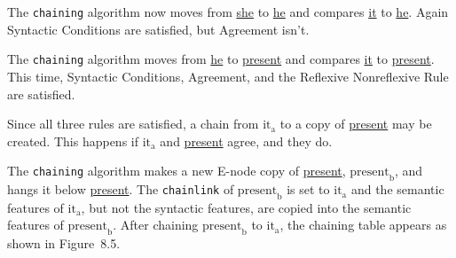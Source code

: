 \documentclass{article}
\begin{document}
\bigbreak
\vbox{}
\bigbreak

The \texttt{chaining} algorithm now moves from \underline{she}
to \underline{he} and compares \underline{it} to
\underline{he}. Again Syntactic Conditions are satisfied, but
Agreement isn't.

\bigbreak
\vbox{}
\bigbreak

The \texttt{chaining} algorithm moves from \underline{he} to
\underline{present} and compares \underline{it} to
\underline{present}. This time, Syntactic Conditions,
Agreement, and the Reflexive Nonreflexive Rule are satisfied.

\bigbreak
\vbox{}
\bigbreak

\noindent Since all three rules are satisfied, a chain from
\underline{${\textrm{it}_{\textrm{a}}}$} to a copy of \underline{present} may be
created. This happens if \underline{${\textrm{it}_{\textrm{a}}}$} and
\underline{present} agree, and they do.

\bigbreak
\vbox{}
\bigbreak

The \texttt{chaining} algorithm makes a new E-node copy of
\underline{present}, \underline{${\textrm{present}_{\textrm{b}}}$}, and hangs it
below \underline{present}. The \texttt{chainlink} of
\underline{${\textrm{present}_{\textrm{b}}}$} is set to \underline{${\textrm{it}_{\textrm{a}}}$} and the
semantic features of \underline{${\textrm{it}_{\textrm{a}}}$}, but not the syntactic
features, are copied into the semantic features of
\underline{${\textrm{present}_{\textrm{b}}}$}. After chaining \underline{${\textrm{present}_{\textrm{b}}}$} to
\underline{${\textrm{it}_{\textrm{a}}}$}, the chaining table appears as shown in
Figure~8.5.
\end{document}

